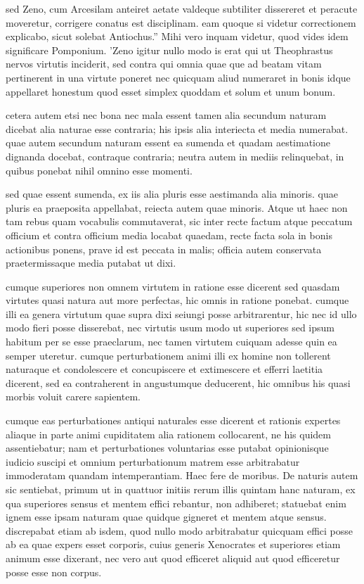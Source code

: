  sed Zeno, cum Arcesilam anteiret aetate valdeque subtiliter dissereret et peracute moveretur, corrigere conatus est disciplinam. eam quoque si videtur correctionem explicabo, sicut solebat Antiochus.'' Mihi vero inquam videtur, quod vides idem significare Pomponium. 'Zeno igitur nullo modo is erat qui ut Theophrastus nervos virtutis inciderit, sed contra qui omnia quae que ad beatam vitam pertinerent in una virtute poneret nec quicquam aliud numeraret in bonis idque appellaret honestum quod esset simplex quoddam et solum et unum bonum.

 cetera autem etsi nec bona nec mala essent tamen alia secundum naturam dicebat alia naturae esse contraria; his ipsis alia interiecta et media numerabat. quae autem secundum naturam essent ea sumenda et quadam aestimatione dignanda docebat, contraque contraria; neutra autem in mediis relinquebat, in quibus ponebat nihil omnino esse momenti.

 sed quae essent sumenda, ex iis alia pluris esse aestimanda alia minoris. quae pluris ea praeposita appellabat, reiecta autem quae minoris. Atque ut haec non tam rebus quam vocabulis commutaverat, sic inter recte factum atque peccatum officium et contra officium media locabat quaedam, recte facta sola in bonis actionibus ponens, prave id est peccata in malis; officia autem conservata praetermissaque media putabat ut dixi.

 cumque superiores non omnem virtutem in ratione esse dicerent sed quasdam virtutes quasi natura aut more perfectas, hic omnis in ratione ponebat. cumque illi ea genera virtutum quae supra dixi seiungi posse arbitrarentur, hic nec id ullo modo fieri posse disserebat, nec virtutis usum modo ut superiores sed ipsum habitum per se esse praeclarum, nec tamen virtutem cuiquam adesse quin ea semper uteretur. cumque perturbationem animi illi ex homine non tollerent naturaque et condolescere et concupiscere et extimescere et efferri laetitia dicerent, sed ea contraherent in angustumque deducerent, hic omnibus his quasi morbis voluit carere sapientem.

 cumque eas perturbationes antiqui naturales esse dicerent et rationis expertes aliaque in parte animi cupiditatem alia rationem collocarent, ne his quidem assentiebatur; nam et perturbationes voluntarias esse putabat opinionisque iudicio suscipi et omnium perturbationum matrem esse arbitrabatur immoderatam quandam intemperantiam. Haec fere de moribus. De naturis autem sic sentiebat, primum ut in quattuor initiis rerum illis quintam hanc naturam, ex qua superiores sensus et mentem effici rebantur, non adhiberet; statuebat enim ignem esse ipsam naturam quae quidque gigneret et mentem atque sensus. discrepabat etiam ab isdem, quod nullo modo arbitrabatur quicquam effici posse ab ea quae expers esset corporis, cuius generis Xenocrates et superiores etiam animum esse dixerant, nec vero aut quod efficeret aliquid aut quod efficeretur posse esse non corpus.

